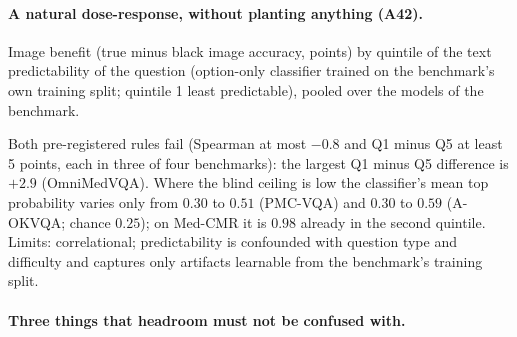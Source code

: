\paragraph{A natural dose-response, without planting anything (A42).}
Image benefit (true minus black image accuracy, points) by quintile of the text predictability of the question (option-only classifier trained on the benchmark's own training split; quintile 1 least predictable), pooled over the models of the benchmark.
\begin{center}
\footnotesize
\setlength{\tabcolsep}{3pt}
\end{center}
Both pre-registered rules fail (Spearman at most $-0.8$ and Q1 minus Q5 at least 5 points, each in three of four benchmarks): the largest Q1 minus Q5 difference is $+2.9$ (OmniMedVQA).
Where the blind ceiling is low the classifier's mean top probability varies only from $0.30$ to $0.51$ (PMC-VQA) and $0.30$ to $0.59$ (A-OKVQA; chance $0.25$); on Med-CMR it is $0.98$ already in the second quintile.
Limits: correlational; predictability is confounded with question type and difficulty and captures only artifacts learnable from the benchmark's training split.

\paragraph{Three things that headroom must not be confused with.}
\begin{center}
\footnotesize
\setlength{\tabcolsep}{3pt}
\end{center}

